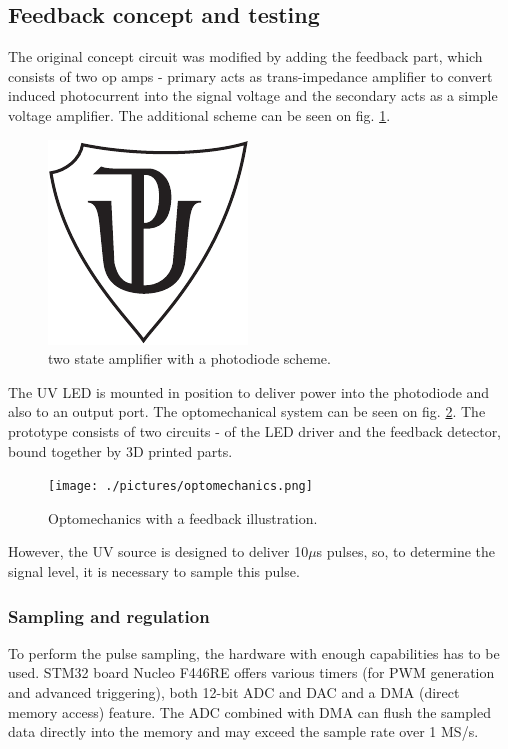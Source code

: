 \subsection{Feedback concept and testing}

The original concept circuit was modified by adding the feedback part, which consists of two op amps - primary acts as trans-impedance amplifier to convert induced photocurrent into the signal voltage and the secondary acts as a simple voltage amplifier. The additional scheme can be seen on fig. \ref{Amplifier}.
   
\begin{figure}[H]
 \centering
 \includegraphics[scale=0.5]{up_logo_bw}
 \caption{two state amplifier with a photodiode scheme.}
 \label{Amplifier}
\end{figure}

The UV LED is mounted in position to deliver power into the photodiode and also to an output port. The optomechanical system can be seen on fig. \ref{Optomechanics}. The prototype consists of two circuits - of the LED driver and the feedback detector, bound together by 3D printed parts.

\begin{figure}[H]
 \centering
 \texttt{[image: ./pictures/optomechanics.png]}
 \caption{Optomechanics with a feedback illustration.}
 \label{Optomechanics}
\end{figure}


However, the UV source is designed to deliver 10$\mu$s pulses, so, to determine the signal level, it is necessary to sample this pulse. 

\subsubsection{Sampling and regulation}

To perform the pulse sampling, the hardware with enough capabilities has to be used. STM32 board Nucleo F446RE \cite{NucF446RE} offers various timers (for PWM generation and advanced triggering), both 12-bit ADC and DAC and a DMA (direct memory access) feature. The ADC combined with DMA can flush the sampled data directly into the memory and may exceed the sample rate over 1 MS/s.

